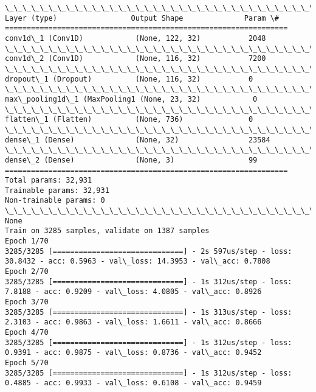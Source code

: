 \documentclass[11pt]{article}
\begin{document}
    \begin{Verbatim}[commandchars=\\\{\}]
\_\_\_\_\_\_\_\_\_\_\_\_\_\_\_\_\_\_\_\_\_\_\_\_\_\_\_\_\_\_\_\_\_\_\_\_\_\_\_\_\_\_\_\_\_\_\_\_\_\_\_\_\_\_\_\_\_\_\_\_\_\_\_\_\_
Layer (type)                 Output Shape              Param \#   
=================================================================
conv1d\_1 (Conv1D)            (None, 122, 32)           2048      
\_\_\_\_\_\_\_\_\_\_\_\_\_\_\_\_\_\_\_\_\_\_\_\_\_\_\_\_\_\_\_\_\_\_\_\_\_\_\_\_\_\_\_\_\_\_\_\_\_\_\_\_\_\_\_\_\_\_\_\_\_\_\_\_\_
conv1d\_2 (Conv1D)            (None, 116, 32)           7200      
\_\_\_\_\_\_\_\_\_\_\_\_\_\_\_\_\_\_\_\_\_\_\_\_\_\_\_\_\_\_\_\_\_\_\_\_\_\_\_\_\_\_\_\_\_\_\_\_\_\_\_\_\_\_\_\_\_\_\_\_\_\_\_\_\_
dropout\_1 (Dropout)          (None, 116, 32)           0         
\_\_\_\_\_\_\_\_\_\_\_\_\_\_\_\_\_\_\_\_\_\_\_\_\_\_\_\_\_\_\_\_\_\_\_\_\_\_\_\_\_\_\_\_\_\_\_\_\_\_\_\_\_\_\_\_\_\_\_\_\_\_\_\_\_
max\_pooling1d\_1 (MaxPooling1 (None, 23, 32)            0         
\_\_\_\_\_\_\_\_\_\_\_\_\_\_\_\_\_\_\_\_\_\_\_\_\_\_\_\_\_\_\_\_\_\_\_\_\_\_\_\_\_\_\_\_\_\_\_\_\_\_\_\_\_\_\_\_\_\_\_\_\_\_\_\_\_
flatten\_1 (Flatten)          (None, 736)               0         
\_\_\_\_\_\_\_\_\_\_\_\_\_\_\_\_\_\_\_\_\_\_\_\_\_\_\_\_\_\_\_\_\_\_\_\_\_\_\_\_\_\_\_\_\_\_\_\_\_\_\_\_\_\_\_\_\_\_\_\_\_\_\_\_\_
dense\_1 (Dense)              (None, 32)                23584     
\_\_\_\_\_\_\_\_\_\_\_\_\_\_\_\_\_\_\_\_\_\_\_\_\_\_\_\_\_\_\_\_\_\_\_\_\_\_\_\_\_\_\_\_\_\_\_\_\_\_\_\_\_\_\_\_\_\_\_\_\_\_\_\_\_
dense\_2 (Dense)              (None, 3)                 99        
=================================================================
Total params: 32,931
Trainable params: 32,931
Non-trainable params: 0
\_\_\_\_\_\_\_\_\_\_\_\_\_\_\_\_\_\_\_\_\_\_\_\_\_\_\_\_\_\_\_\_\_\_\_\_\_\_\_\_\_\_\_\_\_\_\_\_\_\_\_\_\_\_\_\_\_\_\_\_\_\_\_\_\_
None
Train on 3285 samples, validate on 1387 samples
Epoch 1/70
3285/3285 [==============================] - 2s 597us/step - loss: 30.8432 - acc: 0.5963 - val\_loss: 14.3953 - val\_acc: 0.7808
Epoch 2/70
3285/3285 [==============================] - 1s 312us/step - loss: 7.8188 - acc: 0.9209 - val\_loss: 4.0805 - val\_acc: 0.8926
Epoch 3/70
3285/3285 [==============================] - 1s 313us/step - loss: 2.3103 - acc: 0.9863 - val\_loss: 1.6611 - val\_acc: 0.8666
Epoch 4/70
3285/3285 [==============================] - 1s 312us/step - loss: 0.9391 - acc: 0.9875 - val\_loss: 0.8736 - val\_acc: 0.9452
Epoch 5/70
3285/3285 [==============================] - 1s 312us/step - loss: 0.4885 - acc: 0.9933 - val\_loss: 0.6108 - val\_acc: 0.9459

\end{Verbatim}
\end{document}

